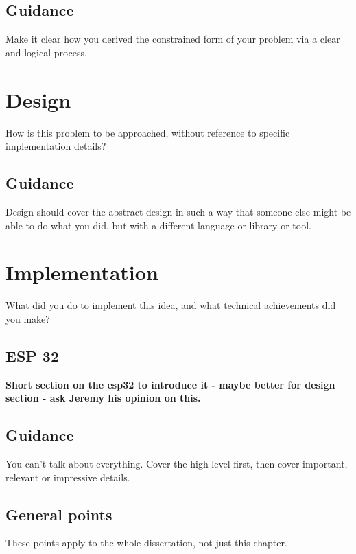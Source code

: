 \documentclass{l4proj}
\begin{document}
\section{Guidance}
Make it clear how you derived the constrained form of your problem via a clear and logical process.

\chapter{Design}
How is this problem to be approached, without reference to specific implementation details?
\section{Guidance}
Design should cover the abstract design in such a way that someone else might be able to do what you did, but with a different language or library or tool.

\chapter{Implementation}
What did you do to implement this idea, and what technical achievements did you make?

\section{ESP 32}

\textbf{Short section on the esp32 to introduce it - maybe better for design section - ask Jeremy his opinion on this. }\\

\section{Guidance}
You can't talk about everything. Cover the high level first, then cover important, relevant or impressive details.



\section{General points}

These points apply to the whole dissertation, not just this chapter.
\end{document}

